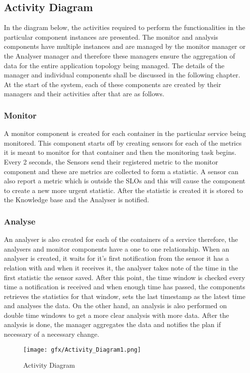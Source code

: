 \subsection{Activity Diagram}
In the diagram below, the activities required to perform the functionalities in the particular component instances are presented. The monitor and analysis components have multiple instances and are managed by the monitor manager or the Analyser manager and therefore these managers ensure the aggregation of data for the entire application topology being managed. The details of the manager and individual components shall be discussed in the following chapter. At the start of the system, each of these components are created by their managers and their activities after that are as follows.
\subsubsection{Monitor}
 A monitor component is created for each container in the particular service being monitored. This component starts off by creating sensors for each of the metrics it is meant to monitor for that container and then the monitoring task begins. Every 2 seconds, the Sensors send their registered metric to the monitor component and these are metrics are collected to form a statistic. A sensor can also report a metric which is outside the SLOs and this will cause the component to create a new more urgent statistic. After the statistic is created it is stored to the Knowledge base and the Analyser is notified.
\subsubsection{Analyse}
An analyser is also created for each of the containers of a service therefore, the analysers and monitor components have a one to one relationship. When an analyser is created, it waits for it's first notification from the sensor it has a relation with and when it receives it, the analyser takes note of the time in the first statistic the sensor saved. After this point, the time window is checked every time a notification is received and when enough time has passed, the components retrieves the statistics for that window, sets the last timestamp as the latest time and analyses the data. On the other hand, an analysis is also performed on double time windows to get a more clear analysis with more data. After the analysis is done, the manager aggregates the data and notifies the plan if necessary of a necessary change.
\begin{figure} 
   \centering 
   \begin{turn}{90}
   \texttt{[image: gfx/Activity\_Diagram1.png]}
   \end{turn}
   \caption{ Activity Diagram} 
   \label{Fig:1} 
\end{figure}


